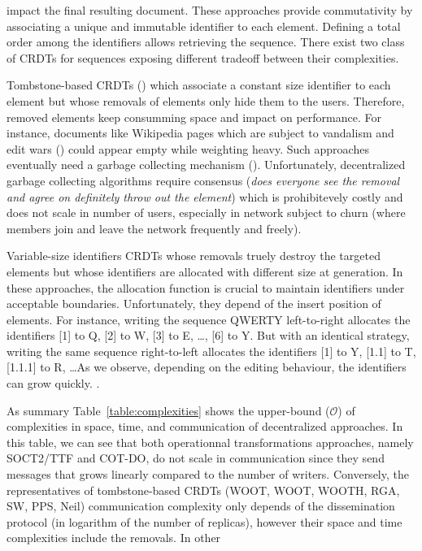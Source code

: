 \begin{asparadesc}
  impact the final resulting document. These approaches provide commutativity by
  associating a unique and immutable identifier to each element. Defining a
  total order among the identifiers allows retrieving the sequence. There exist
  two class of CRDTs for sequences exposing different tradeoff between their
  complexities.
\item [Tombstone-based] CRDTs () which associate a constant size
  identifier to each element but whose removals of elements only hide them to
  the users. Therefore, removed elements keep consumming space and impact on
  performance. For instance, documents like Wikipedia pages which are subject to
  vandalism and edit wars () could appear empty while weighting
  heavy. Such approaches eventually need a garbage collecting mechanism
  ().  Unfortunately, decentralized garbage collecting algorithms
  require consensus (\emph{does everyone see the removal and agree on definitely
    throw out the element}) which is prohibitevely costly and does not scale in
  number of users, especially in network subject to churn (where members join
  and leave the network frequently and freely).
\item [Variable-size identifiers] CRDTs whose removals truely destroy the
  targeted elements but whose identifiers are allocated with different size at
  generation. In these approaches, the allocation function is crucial to
  maintain identifiers under acceptable boundaries. Unfortunately, they depend
  of the insert position of elements. For instance, writing the sequence QWERTY
  left-to-right allocates the identifiers [1] to Q, [2] to W, [3] to E, \ldots,
  [6] to Y. But with an identical strategy, writing the same sequence
  right-to-left allocates the identifiers [1] to Y, [1.1] to T, [1.1.1] to R,
  \ldots As we observe, depending on the editing behaviour, the identifiers
  can grow quickly. .
\item [As summary] Table~\ref{table:complexities} shows the upper-bound
  ($\mathcal{O}$) of complexities in space, time, and communication of
  decentralized approaches. In this table, we can see that both operationnal
  transformations approaches, namely SOCT2/TTF and COT-DO, do not scale in
  communication since they send messages that grows linearly compared to the
  number of writers. Conversely, the representatives of tombstone-based CRDTs
  (WOOT, WOOT, WOOTH, RGA, SW, PPS, Neil) communication complexity only depends
  of the dissemination protocol (in logarithm of the number of replicas),
  however their space and time complexities include the removals. In other

\end{asparadesc}
